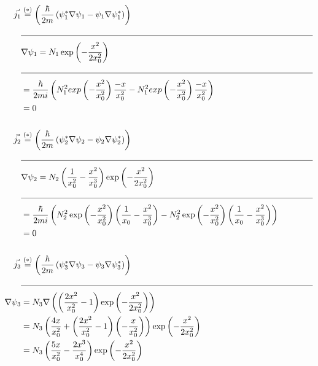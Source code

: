     \begin{align*}
        \vec{j_1} &\stackrel{(*)}{=} \left( \frac{\hbar}{2m} \left( \psi_1^* \nabla \psi_1 - \psi_1 \nabla \psi_1^* \right) \right)\\
        &\text{\noindent\makebox[\linewidth]{\rule{\linewidth}{0.4pt}}}\\
        &\nabla \psi_1 = N_1 \exp \left(-\frac{x^2}{2x_0^2} \right)\\
        &\text{\noindent\makebox[\linewidth]{\rule{\linewidth}{0.4pt}}}\\
        &= \frac{\hbar}{2mi} \left( N_1^2 exp \left( -\frac{x^2}{x_0^2} \right) \frac{-x}{x_0^2} - N_1^2 exp\left( -\frac{x^2}{x_0^2} \right) \frac{-x}{x_0^2} \right)\\
        &= 0\\
        \\
        \vec{j_2} &\stackrel{(*)}{=} \left( \frac{\hbar}{2m} \left( \psi_2^* \nabla \psi_2 - \psi_2 \nabla \psi_2^* \right) \right)\\
        &\text{\noindent\makebox[\linewidth]{\rule{\linewidth}{0.4pt}}}\\
        &\nabla \psi_2 = N_2 \left( \frac{1}{x_0^2} - \frac{x^2}{x_0^3} \right) \exp \left( - \frac{x^2}{2x_0^2} \right)\\
        &\text{\noindent\makebox[\linewidth]{\rule{\linewidth}{0.4pt}}}\\
        &= \frac{\hbar}{2mi} \left( N_2^2 \exp \left( -\frac{x^2}{x_0^2} \right) \left( \frac{1}{x_0} - \frac{x^2}{x_0^3} \right) - N_2^2 \exp \left( -\frac{x^2}{x_0^2} \right) \left( \frac{1}{x_0} - \frac{x^2}{x_0^3} \right)  \right)\\
        &= 0\\
        \\
        \vec{j_3} &\stackrel{(*)}{=} \left( \frac{\hbar}{2m} \left( \psi_3^* \nabla \psi_3 - \psi_3 \nabla \psi_3^* \right) \right)\\
        &\text{\noindent\makebox[\linewidth]{\rule{\linewidth}{0.4pt}}}\\
        \nabla \psi_3 &= N_3 \nabla \left( \left( \frac{2x^2}{x_0^2} -1 \right) \exp \left( -\frac{x^2}{2x_0^2} \right) \right)\\
        &= N_3 \left( \frac{4x}{x_0^2} + \left( \frac{2x^2}{x_0^2} - 1 \right) \left( -\frac{x}{x_0^2} \right) \right) \exp \left( -\frac{x^2}{2x_0^2} \right)\\
        &= N_3 \left( \frac{5x}{x_0^2} - \frac{2x^3}{x_0^4} \right) \exp \left( -\frac{x^2}{2x_0^2} \right)\\

\end{align*}
